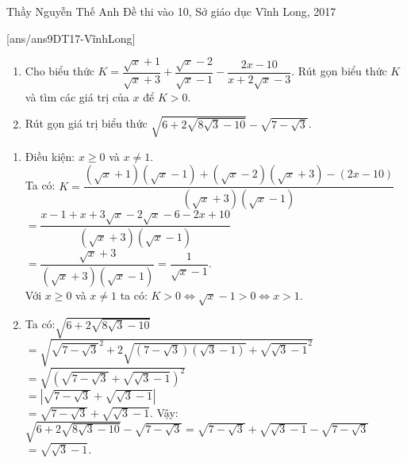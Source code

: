 
\begin{name}
{Thầy  Nguyễn Thế Anh}
{Đề thi vào 10, Sở giáo dục Vĩnh Long, 2017}
\end{name}
\setcounter{ex}{0}
[ans/ans9DT17-VĩnhLong]
\begin{ex}%
    \hfill
    \begin{enumerate}
        \item Cho biểu thức $K =\dfrac{{\sqrt x  + 1}}{{\sqrt x  + 3}} + \dfrac{{\sqrt x  - 2}}{{\sqrt x  - 1}} - \dfrac{{2x - 10}}{{x + 2\sqrt x  - 3}}$. Rút gọn biểu thức $K$ và tìm các giá trị của $x$ để $K>0$.
        \item Rút gọn giá trị biểu thức $\sqrt{6 + 2\sqrt {8\sqrt 3 - 10} }  - \sqrt {7 - \sqrt 3 } $.
    \end{enumerate}
\loigiai
    {
    \begin{enumerate}
        \item
        Điều kiện: $x\geq 0$ và $x\neq 1$.\\
       Ta có: $K=\dfrac{{\left( {\sqrt x  + 1} \right)\left( {\sqrt x  - 1} \right) + \left( {\sqrt x  - 2} \right)\left( {\sqrt x  + 3} \right) - \left( {2x - 10} \right)}}{{\left( {\sqrt x  + 3} \right)\left( {\sqrt x  - 1} \right)}}$\\
        $= \dfrac{{x - 1 + x + 3\sqrt x  - 2\sqrt x  - 6 - 2x + 10}}{{\left( {\sqrt x  + 3} \right)\left( {\sqrt x  - 1} \right)}}$\\
        $= \dfrac{{\sqrt x  + 3}}{{\left( {\sqrt x  + 3} \right)\left( {\sqrt x  - 1} \right)}} = \dfrac{1}{{\sqrt x  - 1}}.$\\
Với $x\geq 0$ và $x\neq 1$ ta có: $K>0 \Leftrightarrow \sqrt x  - 1 > 0 \Leftrightarrow x>1$.
        \item
Ta có:$\sqrt {6 + 2\sqrt {8\sqrt 3  - 10} }$
  $= \sqrt {{{\sqrt {7 - \sqrt 3 } }^2} + 2\sqrt {\left( {7 - \sqrt 3 } \right)\left( {\sqrt 3  - 1} \right)}  + {{\sqrt {\sqrt 3  - 1} }^2}}$ \\
  $= \sqrt {{{\left( {\sqrt {7 - \sqrt 3 }  + \sqrt {\sqrt 3  - 1} } \right)}^2}}$ \\
  $= \left| {\sqrt {7 - \sqrt 3 }  + \sqrt {\sqrt 3  - 1} } \right|$\\
  $= \sqrt {7 - \sqrt 3 }  + \sqrt {\sqrt 3  - 1}.$
Vậy:$\sqrt {6 + 2\sqrt {8\sqrt 3  - 10} }  - \sqrt {7 - \sqrt 3 }  = \sqrt {7 - \sqrt 3 }  + \sqrt {\sqrt 3  - 1}  - \sqrt {7 - \sqrt 3 }$
 $= \sqrt {\sqrt 3  - 1}.$
     \end{enumerate}
    }
\end{ex}

